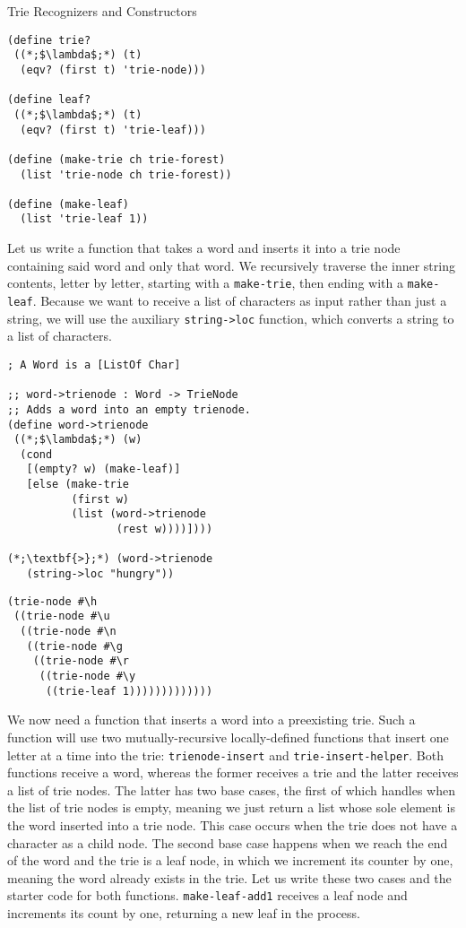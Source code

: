 \begin{cl}[]{Trie Recognizers and Constructors}
\begin{lstlisting}[language=MyScheme]
(define trie?
 ((*;$\lambda$;*) (t)
  (eqv? (first t) 'trie-node)))

(define leaf?
 ((*;$\lambda$;*) (t)
  (eqv? (first t) 'trie-leaf)))

(define (make-trie ch trie-forest)
  (list 'trie-node ch trie-forest))

(define (make-leaf)
  (list 'trie-leaf 1))
\end{lstlisting}
\end{cl}

Let us write a function that takes a word and inserts it into a trie node containing said word and only that word. We recursively traverse the inner string contents, letter by letter, starting with a \texttt{make-trie}, then ending with a \texttt{make-leaf}. Because we want to receive a list of characters as input rather than just a string, we will use the auxiliary \texttt{string->loc} function, which converts a string to a list of characters.

\begin{cloast}[]{}
\begin{lstlisting}[language=MyScheme]
; A Word is a [ListOf Char]

;; word->trienode : Word -> TrieNode
;; Adds a word into an empty trienode.
(define word->trienode
 ((*;$\lambda$;*) (w)
  (cond
   [(empty? w) (make-leaf)]
   [else (make-trie 
          (first w) 
          (list (word->trienode 
                 (rest w))))])))

(*;\textbf{>};*) (word->trienode 
   (string->loc "hungry"))
\end{lstlisting}
\tcblower
\begin{lstlisting}[language=MyOutput]
(trie-node #\h 
 ((trie-node #\u 
  ((trie-node #\n 
   ((trie-node #\g 
    ((trie-node #\r 
     ((trie-node #\y 
      ((trie-leaf 1)))))))))))))
\end{lstlisting}
\end{cloast}

We now need a function that inserts a word into a preexisting trie. Such a function will use two mutually-recursive locally-defined functions that insert one letter at a time into the trie: \texttt{trienode-insert} and \texttt{trie-insert-helper}. Both functions receive a word, whereas the former receives a trie and the latter receives a list of trie nodes. The latter has two base cases, the first of which handles when the list of trie nodes is empty, meaning we just return a list whose sole element is the word inserted into a trie node. This case occurs when the trie does not have a character as a child node. The second base case happens when we reach the end of the word and the trie is a leaf node, in which we increment its counter by one, meaning the word already exists in the trie. Let us write these two cases and the starter code for both functions. \texttt{make-leaf-add1} receives a leaf node and increments its count by one, returning a new leaf in the process.

